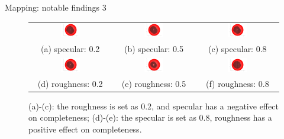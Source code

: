 \documentclass[10pt]{beamer}
\begin{document}
\begin{frame}{Mapping: notable findings 3}

\begin{figure}[!htbp]
\centering
\begin{tabular}{ccc}
\includegraphics[width=0.25\textwidth]{mapping/sl_spec_rough/sl_00050202}&
\includegraphics[width=0.25\textwidth]{mapping/sl_spec_rough/sl_00050502}&
\includegraphics[width=0.25\textwidth]{mapping/sl_spec_rough/sl_00050802}\\
(a) specular: 0.2 & (b) specular: 0.5 & (c) specular: 0.8\\
\includegraphics[width=0.25\textwidth]{mapping/sl_spec_rough/sl_00050802}&
\includegraphics[width=0.25\textwidth]{mapping/sl_spec_rough/sl_00050805}&
\includegraphics[width=0.25\textwidth]{mapping/sl_spec_rough/sl_00050808}\\
(d) roughness: 0.2 & (e) roughness: 0.5 & (f) roughness: 0.8\\
\end{tabular}
\caption{(a)-(c): the roughness is set as 0.2, and specular has a negative effect on completeness; (d)-(e): the specular is set as 0.8, roughness has a positive effect on completeness.}
\end{figure}

\end{frame}
\end{document}
